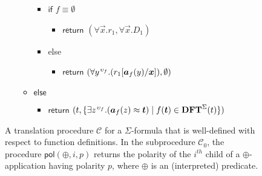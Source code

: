 \documentclass[runningheads,a4paper]{llncs}
\newcommand{\con}[1]{\mathsf{#1}}
\newcommand{\teq}{\approx}
\newcommand{\functerms}{\mathbf{DFT}}
\newcommand{\conv}{\mathcal{C}}
\newcommand{\pol}{\con{pol}}
\newcommand{\boolop}{\oplus}
\newcommand{\fnull}{\emptyset}
\newcommand{\vecfarg}[1]{\vec{a}_{#1}}
\newcommand{\fargsort}[1]{\upsilon_{#1}}
\newcommand{\vthinspace}{\kern+0.083333em}
\newcommand{\typ}[1]{^{\vthinspace #1}}
\begin{document}
\begin{figure}[t]
\begin{enumerate}
\begin{itemize}
\begin{itemize}
      \item[] $\mathsf{if}$ $f \equiv \fnull$
      \begin{itemize}
        \item[] $\mathsf{return}$ $( \forall \vec x. r_1, \forall \vec x. D_1 )$
      \end{itemize}
      \item[] else
      \begin{itemize}
        \item[] $\mathsf{return}$ $( \forall y\typ{\fargsort{f}}. ( r_1 [ \vecfarg{f}( y ) / \vec x ] ), \emptyset )$
      \end{itemize}
    \end{itemize}
   \item[] $\mathsf{else}$
   \begin{itemize}
     \item[] $\mathsf{return}$ $( t, \{ \exists z\typ{\fargsort{f}}. ( \vecfarg{f}( z ) \teq \vec t ) \mid f( \vec t ) \in \functerms^\Sigma( t ) \} )$
   \end{itemize}
 \end{itemize}
\end{enumerate}
\vspace{-2ex}
\caption{A translation procedure $\conv$ for a $\Sigma$-formula that is well-defined with respect to function definitions.
In the subprocedure $\conv_0$, the procedure $\pol( \boolop, i, p )$ returns the polarity of the $i^{th}$ child of a $\boolop$-application having polarity $p$,
where $\boolop$ is an (interpreted) predicate.
}
\label{fig:encoding}
\end{figure}
\end{document}
